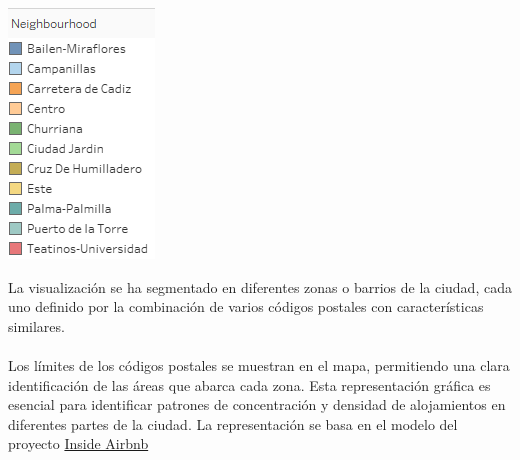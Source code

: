 \begin{minipage}{0.17\textwidth}
\includegraphics[width=\textwidth]{capturas/26.png}
\end{minipage}
\begin{minipage}[height=10cm,width=2cm]{11cm}
La visualización se ha segmentado en diferentes zonas o barrios de la ciudad, cada uno definido por la combinación de varios códigos postales con características similares.\\\\ 
Los límites de los códigos postales se muestran en el mapa, permitiendo una clara identificación de las áreas que abarca cada zona. Esta representación gráfica es esencial para identificar patrones de concentración y densidad de alojamientos en diferentes partes de la ciudad. La representación se basa en el modelo del proyecto \href{http://insideairbnb.com/malaga/}{Inside Airbnb}

\end{minipage}%

